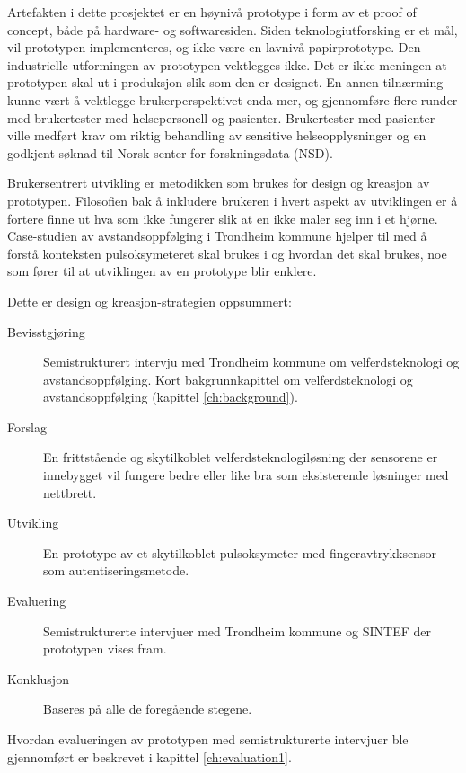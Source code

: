 Artefakten i dette prosjektet er en høynivå prototype i form av et proof of concept, både på hardware- og softwaresiden.
Siden teknologiutforsking er et mål, vil
prototypen implementeres, og ikke være en lavnivå papirprototype. Den industrielle utformingen av prototypen vektlegges ikke. Det er
ikke meningen at prototypen skal ut i produksjon slik som den er designet. En annen tilnærming kunne vært å vektlegge brukerperspektivet enda mer,
og gjennomføre flere runder med brukertester med helsepersonell og pasienter. Brukertester med pasienter ville medført krav om
riktig behandling av sensitive helseopplysninger og en godkjent søknad til Norsk senter for forskningsdata (NSD).

Brukersentrert utvikling er metodikken som brukes for design og kreasjon av prototypen. Filosofien bak å inkludere brukeren i hvert aspekt
av utviklingen er å fortere finne ut hva som ikke fungerer slik at en ikke maler seg inn i et hjørne. Case-studien av avstandsoppfølging
i Trondheim kommune hjelper til med å forstå konteksten pulsoksymeteret skal brukes i og hvordan det skal brukes, noe
som fører til at utviklingen av en prototype blir enklere.

\begin{minipage}{\linewidth}
Dette er design og kreasjon-strategien oppsummert:\newline

\begin{description}
  \item [Bevisstgjøring] Semistrukturert intervju med Trondheim kommune om velferdsteknologi og avstandsoppfølging. Kort bakgrunnkapittel
      om velferdsteknologi og avstandsoppfølging (kapittel \ref{ch:background}).
  \item [Forslag] En frittstående og skytilkoblet velferdsteknologiløsning der sensorene er innebygget vil fungere bedre
      eller like bra som eksisterende løsninger med nettbrett.
  \item [Utvikling] En prototype av et skytilkoblet pulsoksymeter med fingeravtrykksensor som autentiseringsmetode.
  \item [Evaluering] Semistrukturerte intervjuer med Trondheim kommune og SINTEF der prototypen vises fram.
  \item [Konklusjon] Baseres på alle de foregående stegene.
\end{description}
\end{minipage}

Hvordan evalueringen av prototypen med semistrukturerte intervjuer ble gjennomført er beskrevet i kapittel \ref{ch:evaluation1}.


